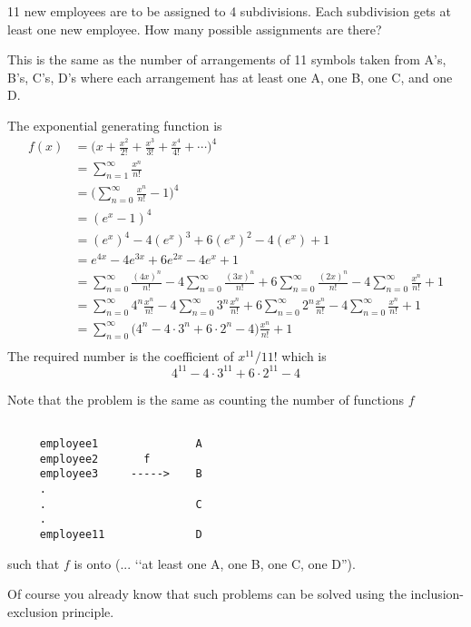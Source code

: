 \newcommand\expo[1]{ \sum_{n=0}^\infty \frac{#1^n}{n!} }

\begin{eg}
11 new employees are to be assigned to 4 subdivisions.
Each subdivision gets at least one new employee.
How many possible assignments are there?
\end{eg}

This is the same as the number of arrangements of 11 symbols taken from 
A's, B's, C's, D's where
each arrangement has at least one A, one B, one C, and one D.

The exponential generating function is
\begin{align*}
f(x)
&= \biggl( x + \frac{x^2}{2!} 
   + \frac{x^3}{3!} + \frac{x^4}{4!} + \cdots \biggr)^4 \\
&= \sum_{n=1}^\infty \frac{x^n}{n!}  \\
&= \biggl( \sum_{n=0}^\infty \frac{x^n}{n!} - 1 \biggr) ^4 \\
&= ( e^x - 1 ) ^4 \\
&= (e^x)^4 - 4(e^x)^3 + 6(e^x)^2 - 4 (e^x) + 1 \\
&= e^{4x} - 4e^{3x} + 6e^{2x} - 4 e^x + 1 \\
&= \expo{(4x)} - 4 \expo{(3x)} + 6 \expo{(2x)} - 4 \expo{x} + 1 \\
&= \sum_{n=0}^\infty 4^n \frac{x^n}{n!}
   -4\sum_{n=0}^\infty 3^n \frac{x^n}{n!}
   +6\sum_{n=0}^\infty 2^n \frac{x^n}{n!}
   -4\sum_{n=0}^\infty \frac{x^n}{n!}
   + 1 \\
&= \sum_{n=0}^\infty 
   \biggl(
   4^n 
   -4 \cdot 3^n 
   +6 \cdot 2^n 
   -4  
   \biggr) \frac{x^n}{n!}
   + 1 \\
\end{align*}
The required number is the coefficient of $x^{11}/11!$ which is
\[
   4^{11}
   -4 \cdot 3^{11} 
   +6 \cdot 2^{11}
   -4  
\]

Note that the problem is the same as counting the number of 
functions $f$
\begin{verbatim}

     employee1               A
     employee2       f
     employee3     ----->    B
     .   
     .                       C
     .
     employee11              D

\end{verbatim}
such that $f$ is onto
(... \lq\lq at least one A, one B, one C, one D'').

Of course you already know that such problems can be solved using
the inclusion-exclusion principle.

